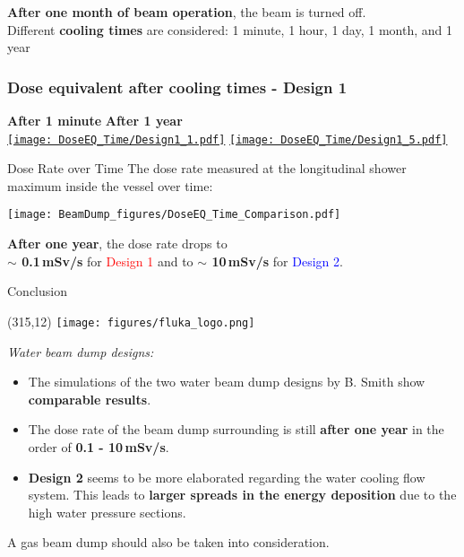 \documentclass[xcolor={dvipsnames}]{beamer}
\newcommand{\flukalogo}{
  \setlength{\TPHorizModule}{1pt}
  \setlength{\TPVertModule}{1pt}
  \begin{textblock}{1}(315,12)
   \texttt{[image: figures/fluka\_logo.png]}
  \end{textblock}
}
\begin{document}
\begin{frame}
\textbf{After one month of beam operation}, the beam is turned off.\\
Different \textbf{cooling times} are considered: 1 minute, 1 hour, 1 day, 1 month, and 1 year\\
  \frametitle{Dose equivalent after cooling times - \textbf{Design 1}}
  \hypertarget{coolingtimesprev_Design1}{}
  \begin{center}
    \hspace*{1.6cm} \textbf{After 1 minute} \hfill \textbf{After 1 year} \hspace*{2.1cm} \\
  \hyperlink{Dose_equivalent_minute_Design1}{\texttt{[image: DoseEQ\_Time/Design1\_1.pdf]}}\hfil
  \hyperlink{Dose_equivalent_year_Design1}{\texttt{[image: DoseEQ\_Time/Design1\_5.pdf]}}
 \end{center}
\end{frame}
\begin{frame}{Dose Rate over Time}
The dose rate measured at the longitudinal shower maximum inside the vessel over time:
\begin{center}
  \texttt{[image: BeamDump\_figures/DoseEQ\_Time\_Comparison.pdf]}
\end{center}
\textbf{After one year}, the dose rate drops to \\\textbf{$\sim$ 0.1\,mSv/s} for \textcolor{Red}{Design 1} and to \textbf{$\sim$ 10\,mSv/s} for \textcolor{Blue}{Design 2}.
\end{frame}

\begin{frame}{Conclusion}
 \flukalogo
 \textit{Water beam dump designs:}
 \begin{itemize}
  \item The simulations of the two water beam dump designs by B. Smith show \textbf{comparable results}.
  \item The dose rate of the beam dump surrounding is still \textbf{after one year} in the order of \textbf{0.1 - 10\,mSv/s}.
  \item \textbf{Design 2} seems to be more elaborated regarding the water cooling flow system.
  This leads to \textbf{larger spreads in the energy deposition} due to the high water pressure sections.
 \end{itemize}
 \alert{A gas beam dump should also be taken into consideration.}\\ \vspace*{0.2cm}
\end{frame}
\end{document}
